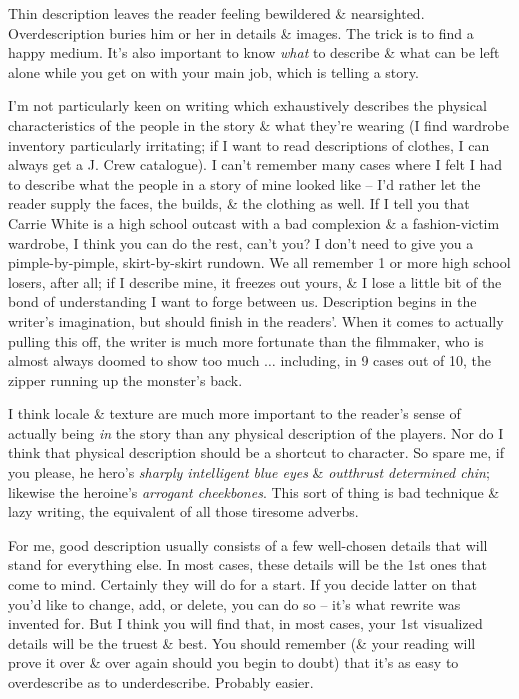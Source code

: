 \documentclass{article}
\numberwithin{equation}{section}
\begin{document}
Thin description leaves the reader feeling bewildered \& nearsighted. Overdescription buries him or her in details \& images. The trick is to find a happy medium. It's also important to know \textit{what} to describe \& what can be left alone while you get on with your main job, which is telling a story.

I'm not particularly keen on writing which exhaustively describes the physical characteristics of the people in the story \& what they're wearing (I find wardrobe inventory particularly irritating; if I want to read descriptions of clothes, I can always get a J. Crew catalogue). I can't remember many cases where I felt I had to describe what the people in a story of mine looked like -- I'd rather let the reader supply the faces, the builds, \& the clothing as well. If I tell you that Carrie White is a high school outcast with a bad complexion \& a fashion-victim wardrobe, I think you can do the rest, can't you? I don't need to give you a pimple-by-pimple, skirt-by-skirt rundown. We all remember 1 or more high school losers, after all; if I describe mine, it freezes out yours, \& I lose a little bit of the bond of understanding I want to forge between us. Description begins in the writer's imagination, but should finish in the readers'. When it comes to actually pulling this off, the writer is much more fortunate than the filmmaker, who is almost always doomed to show too much $\ldots$ including, in 9 cases out of 10, the zipper running up the monster's back.

I think locale \& texture are much more important to the reader's sense of actually being \textit{in} the story than any physical description of the players. Nor do I think that physical description should be a shortcut to character. So spare me, if you please, he hero's \textit{sharply intelligent blue eyes} \& \textit{outthrust determined chin}; likewise the heroine's \textit{arrogant cheekbones}. This sort of thing is bad technique \& lazy writing, the equivalent of all those tiresome adverbs.

For me, good description usually consists of a few well-chosen details that will stand for everything else. In most cases, these details will be the 1st ones that come to mind. Certainly they will do for a start. If you decide latter on that you'd like to change, add, or delete, you can do so -- it's what rewrite was invented for. But I think you will find that, in most cases, your 1st visualized details will be the truest \& best. You should remember (\& your reading will prove it over \& over again should you begin to doubt) that it's as easy to overdescribe as to underdescribe. Probably easier.
\end{document}

